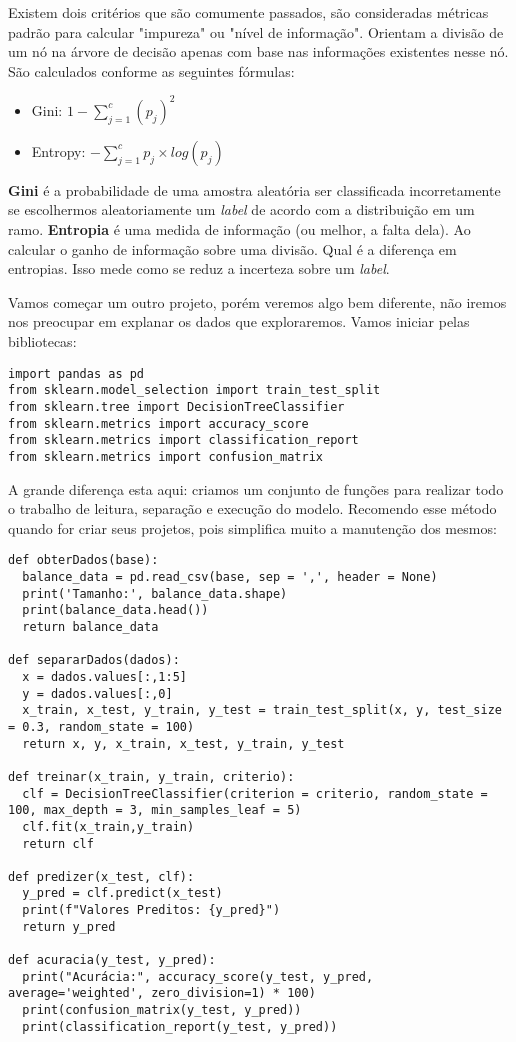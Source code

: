 Existem dois critérios que são comumente passados, são consideradas métricas padrão para calcular "impureza" ou "nível de informação". Orientam a divisão de um nó na árvore de decisão apenas com base nas informações existentes nesse nó. São calculados conforme as seguintes fórmulas:
\begin{itemize}
	\item Gini: $1 - \sum_{j=1}^{c} (p_{j})^{2}$
	\item Entropy: $-\sum_{j=1}^{c} p_{j} \times log(p_{j})$
\end{itemize}

\textbf{Gini} é a probabilidade de uma amostra aleatória ser classificada incorretamente se escolhermos aleatoriamente um \textit{label} de acordo com a distribuição em um ramo. \textbf{Entropia} é uma medida de informação (ou melhor, a falta dela). Ao calcular o ganho de informação sobre uma divisão. Qual é a diferença em entropias. Isso mede como se reduz a incerteza sobre um \textit{label}.

Vamos começar um outro projeto, porém veremos algo bem diferente, não iremos nos preocupar em explanar os dados que exploraremos. Vamos iniciar pelas bibliotecas:
\begin{lstlisting}[]
import pandas as pd
from sklearn.model_selection import train_test_split
from sklearn.tree import DecisionTreeClassifier
from sklearn.metrics import accuracy_score
from sklearn.metrics import classification_report
from sklearn.metrics import confusion_matrix
\end{lstlisting}

A grande diferença esta aqui: criamos um conjunto de funções para realizar todo o trabalho de leitura, separação e execução do modelo. Recomendo esse método quando for criar seus projetos, pois simplifica muito a manutenção dos mesmos:
\begin{lstlisting}[]
def obterDados(base):
  balance_data = pd.read_csv(base, sep = ',', header = None)
  print('Tamanho:', balance_data.shape)
  print(balance_data.head())
  return balance_data

def separarDados(dados):
  x = dados.values[:,1:5]
  y = dados.values[:,0]
  x_train, x_test, y_train, y_test = train_test_split(x, y, test_size = 0.3, random_state = 100)
  return x, y, x_train, x_test, y_train, y_test

def treinar(x_train, y_train, criterio):
  clf = DecisionTreeClassifier(criterion = criterio, random_state = 100, max_depth = 3, min_samples_leaf = 5)
  clf.fit(x_train,y_train)
  return clf

def predizer(x_test, clf):
  y_pred = clf.predict(x_test)
  print(f"Valores Preditos: {y_pred}")
  return y_pred

def acuracia(y_test, y_pred):
  print("Acurácia:", accuracy_score(y_test, y_pred, average='weighted', zero_division=1) * 100)
  print(confusion_matrix(y_test, y_pred))
  print(classification_report(y_test, y_pred))
\end{lstlisting}

